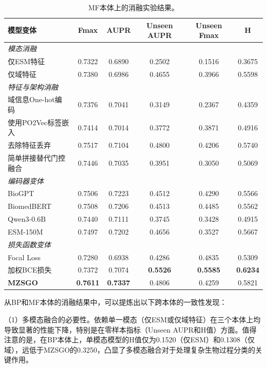 \begin{table}[htbp]
    \centering
    \caption{MF本体上的消融实验结果。}
    \label{tab:mzsgo_ablation_mf}
    \small
    \begin{tabular}{lccccc}
        \toprule
        \textbf{模型变体} & \textbf{Fmax} & \textbf{AUPR} & \textbf{Unseen AUPR} & \textbf{Unseen Fmax} & \textbf{H} \\
        \midrule
        \multicolumn{6}{l}{\textit{模态消融}} \\
        仅ESM特征 & 0.7322 & 0.6890 & 0.2502 & 0.1516 & 0.3675 \\
        仅域特征 & 0.7380 & 0.6986 & 0.4655 & 0.3966 & 0.5598 \\
        \midrule
        \multicolumn{6}{l}{\textit{特征与架构消融}} \\
        域信息One-hot编码 & 0.7376 & 0.7041 & 0.3149 & 0.2367 & 0.4359 \\
        使用PO2Vec标签嵌入 & 0.7414 & 0.7014 & 0.3772 & 0.3871 & 0.4916 \\
        去除特征丢弃 & 0.7517 & 0.7104 & 0.4800 & 0.4206 & 0.5740 \\
        简单拼接替代门控融合 & 0.7446 & 0.7035 & 0.3951 & 0.3050 & 0.5069 \\
        \midrule
        \multicolumn{6}{l}{\textit{编码器变体}} \\
        BioGPT & 0.7506 & 0.7223 & 0.4512 & 0.4290 & 0.5566 \\
        BiomedBERT & 0.7508 & 0.7206 & 0.4513 & 0.4485 & 0.5562 \\
        Qwen3-0.6B & 0.7440 & 0.7111 & 0.3745 & 0.3428 & 0.4915 \\
        ESM-150M & 0.7497 & 0.7202 & 0.4656 & 0.3527 & 0.5667 \\
        \midrule
        \multicolumn{6}{l}{\textit{损失函数变体}} \\
        Focal Loss & 0.7280 & 0.6938 & 0.4286 & 0.4835 & 0.5309 \\
        加权BCE损失 & 0.7372 & 0.7074 & \textbf{0.5526} & \textbf{0.5585} & \textbf{0.6234} \\
        \midrule
        \textbf{MZSGO} & \textbf{0.7611} & \textbf{0.7337} & 0.4806 & 0.4259 & 0.5821 \\
        \bottomrule
    \end{tabular}
\end{table}

从BP和MF本体的消融结果中，可以提炼出以下跨本体的一致性发现：

（1）多模态融合的必要性。依赖单一模态（仅ESM或仅域特征）在三个本体上均导致显著的性能下降，特别是在零样本指标（Unseen AUPR和H值）方面。值得注意的是，在BP本体上，单模态模型的H值仅为0.1520（仅ESM）和0.1308（仅域），远低于MZSGO的0.3250，凸显了多模态融合对于处理复杂生物过程分类的关键作用。

